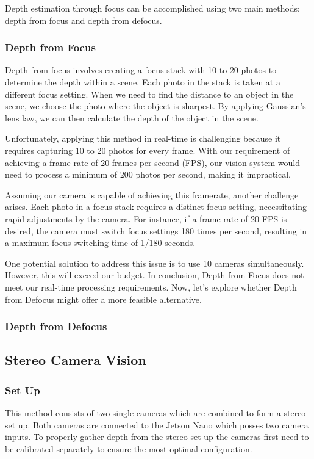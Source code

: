 \documentclass{article}[a4paper]
\begin{document}
Depth estimation through focus can be accomplished using two main methods: depth from focus and depth from defocus.

\subsubsection{Depth from Focus}

Depth from focus involves creating a focus stack with 10 to 20 photos to determine the depth within a scene. Each photo in the stack is taken at a different focus setting. When we need to find the distance to an object in the scene, we choose the photo where the object is sharpest. By applying Gaussian's lens law, we can then calculate the depth of the object in the scene.

Unfortunately, applying this method in real-time is challenging because it requires capturing 10 to 20 photos for every frame. With our requirement of achieving a frame rate of 20 frames per second (FPS), our vision system would need to process a minimum of 200 photos per second, making it impractical.

Assuming our camera is capable of achieving this framerate, another challenge arises. Each photo in a focus stack requires a distinct focus setting, necessitating rapid adjustments by the camera. For instance, if a frame rate of 20 FPS is desired, the camera must switch focus settings 180 times per second, resulting in a maximum focus-switching time of 1/180 seconds.

One potential solution to address this issue is to use 10 cameras simultaneously. However, this will exceed our budget. In conclusion, Depth from Focus does not meet our real-time processing requirements. Now, let's explore whether Depth from Defocus might offer a more feasible alternative.

\subsubsection{Depth from Defocus}


\newpage
\subsection{Stereo Camera Vision}
\subsubsection{Set Up}
This method consists of two single cameras which are combined to form a stereo set up. Both cameras are connected to the Jetson Nano which posses two camera inputs. To properly gather depth from the stereo set up the cameras first need to be calibrated separately to ensure the most optimal configuration.
\end{document}
